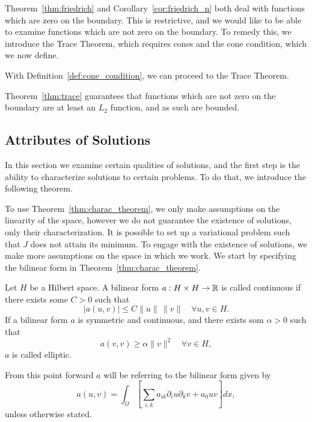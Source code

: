 
Theorem~\ref{thm:friedrich} and Corollary~\ref{cor:friedrich_n} both deal with 
functions which are zero on the boundary. 
This is restrictive, and we would like to be able to examine 
functions which are not zero on the boundary.
To remedy this, we introduce the Trace Theorem, which requires cones and the cone condition, which we now define.

With Definition~\ref{def:cone_condition}, we can proceed to the Trace Theorem.

Theorem~\ref{thm:trace} guarantees that functions which are not 
zero on the boundary are at least an $L_2$ function, and as such are bounded. 
\subsection{Attributes of Solutions}
In this section we examine certain qualities of solutions, and the first step is 
the ability to characterize solutions to certain problems.
To do that, we introduce the following theorem.

To use Theorem~\ref{thm:charac_theorem}, we
only make assumptions on the linearity of the space, however we
do not guarantee the existence  of solutions, only their characterization.
It is possible to set up a variational problem such that $J$ does 
not attain its minimum.
To engage with the existence of solutions, we make more assumptions on 
the space in which we work.
We start by specifying the bilinear form in Theorem~\ref{thm:charac_theorem}.
\begin{defn}{\quad}
   Let $H$ be a Hilbert space. A bilinear form $a : H \times H \to \mathbb{R}$ is 
   called continuous if there exists some $C > 0$ such that 
   \begin{equation}
    |a(u,v)| \leq C \|u\|\, \|v\| \quad \forall u,v \in H.
   \end{equation} 
   If a bilinear form $a$ is symmetric and continuous, and there exists som $\alpha >0$ such that 
   \begin{equation*}
    a(v,v) \geq \alpha \|v\|^2 \quad \forall v \in H,
   \end{equation*}
   $a$ is called elliptic.\label{def:elliptic}
 \end{defn}
From this point forward $a$ will be referring to the bilinear form given by
\begin{equation}
   a(u,v) = \int_\Omega \left[\sum_{i,k} a_{ik}\partial_i u\partial_k v+a_0uv\right]dx,
\end{equation}
unless otherwise stated.

